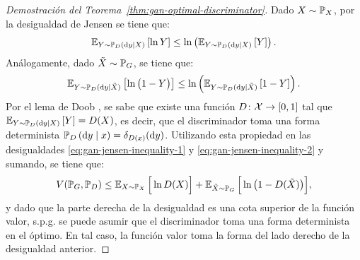 {{\begin{proof}[Demostración del Teorema~\ref{thm:gan-optimal-discriminator}]
    Dado $X \sim \Prob_X$, por la desigualdad de Jensen se tiene que:
    \begin{equation}\label{eq:gan-jensen-inequality-1}
        \Exp_{Y \sim \Prob_D \left( \dd y \mid X \right)} \left[ \ln Y \right]
        \leq \ln \left( \Exp_{Y \sim \Prob_D \left( \dd y \mid X \right)} \left[ Y \right] \right).
    \end{equation}
    Análogamente, dado $\tilde X \sim \Prob_G$, se tiene que:
    \begin{equation}\label{eq:gan-jensen-inequality-2}
        \Exp_{Y \sim \Prob_D ( \dd y \mid \tilde X )} \left[ \ln \qty\big(1 - Y) \right]
        \leq \ln \left( \Exp_{Y \sim \Prob_D ( \dd y \mid \tilde X )} \left[ 1 - Y \right] \right).
    \end{equation}
    Por el lema de Doob \cite[Ver pág. 316, Cor. 9.4.11]{san2018teoria}, se sabe que existe una función $D \colon \mathcal{X} \to [0, 1]$ tal que $\Exp_{Y \sim \Prob_D \left( \dd y \mid X \right)} \left[ Y \right]
        = D(X)$,
    es decir, que el discriminador toma una forma determinista $\Prob_D \left( \dd y \mid x \right) = \delta_{D(x)}(\dd y)$. Utilizando esta propiedad en las desigualdades \eqref{eq:gan-jensen-inequality-1} y \eqref{eq:gan-jensen-inequality-2} y sumando, se tiene que:
    \begin{equation}
        V(\Prob_G, \Prob_D) \leq \Exp_{X \sim \Prob_X} \Big[ \ln D(X) \Big] + \Exp_{\tilde X \sim \Prob_G} \Big[ \ln \qty\big(1 - D(\tilde X)) \Big],
    \end{equation}
    y dado que la parte derecha de la desigualdad es una cota superior de la función valor, s.p.g. se puede asumir que el discriminador toma una forma determinista en el óptimo. En tal caso, la función valor toma la forma del lado derecho de la desigualdad anterior.


\end{proof}}}
